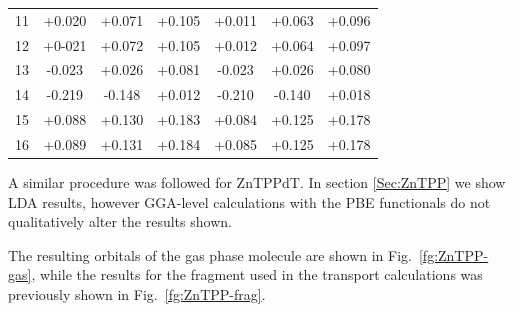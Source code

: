 \documentclass[aip,jcp,a4paper,reprint,floatfix,superscriptaddress]{revtex4-1}
\begin{document}
\begin{table}
{\begin{tabular}{c|ccc|ccc}
 11 & +0.020 & +0.071 & +0.105 & +0.011 & +0.063 & +0.096 \\ 
 12 & +0-021 & +0.072 & +0.105 & +0.012 & +0.064 & +0.097 \\ 
 13 & -0.023 & +0.026 & +0.081 & -0.023 & +0.026 & +0.080 \\ 
 14 & -0.219 & -0.148 & +0.012 & -0.210 & -0.140 & +0.018 \\ 
 15 & +0.088 & +0.130 & +0.183 & +0.084 & +0.125 & +0.178 \\ 
 16 & +0.089 & +0.131 & +0.184 & +0.085 & +0.125 & +0.178 \\ \hline\hline
\end{tabular}
}
\end{table}

A similar procedure was followed for ZnTPPdT. In section \ref{Sec:ZnTPP} we show LDA results, however GGA-level calculations with the PBE functionals do not qualitatively alter the results shown.

The resulting orbitals of the gas phase molecule are shown in Fig.~\ref{fg:ZnTPP-gas}, while the results for the fragment used in the transport calculations was previously shown in Fig.~\ref{fg:ZnTPP-frag}.
\end{document}
